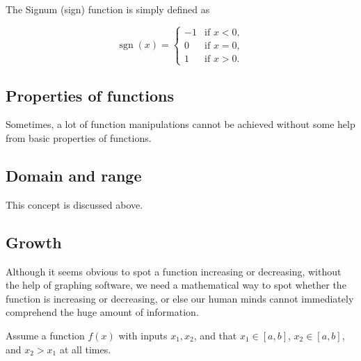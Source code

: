 The Signum (sign) function is simply defined as



\[
\operatorname{sgn}(x)=
\begin{cases}
-1 & \text{if } x<0,\\
0 & \text{if } x=0,\\
1 & \text{if } x>0.
\end{cases}
\]


\subsection{Properties of functions}
\label{sss:prop-3b03}




Sometimes, a lot of function manipulations cannot be achieved without some help from basic
properties of functions.




\subsection{Domain and range}
\label{sss:doma-1606}




This concept is discussed above.




\subsection{Growth}
\label{sss:grow-5ff5}




Although it seems obvious to spot a function increasing or decreasing, without the help of
graphing software, we need a mathematical way to spot whether the function is increasing
or decreasing, or else our human minds cannot immediately comprehend the huge amount of
information.



Assume a function $f(x)$ with inputs $x _1,x _2$, and that $x _1\in[a,b]$, $x _2\in[a,b]$,
and $x _2>x _1$ at all times.



